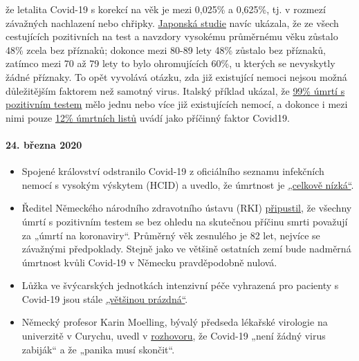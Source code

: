 \begin{itemize}
  že letalita Covid-19 s korekcí na věk je mezi 0,025\% a 0,625\%, tj. v
  rozmezí závažných nachlazení nebo chřipky.
  \href{https://www.niid.go.jp/niid/en/2019-ncov-e/9407-covid-dp-fe-01.html}{Japonská
  studie} navíc ukázala, že ze všech cestujících pozitivních na test a
  navzdory vysokému průměrnému věku zůstalo 48\% zcela bez příznaků;
  dokonce mezi 80-89 lety 48\% zůstalo bez příznaků, zatímco mezi 70 až
  79 lety to bylo ohromujících 60\%, u kterých se nevyskytly žádné
  příznaky. To opět vyvolává otázku, zda již existující nemoci nejsou
  možná důležitějším faktorem než samotný virus. Italský příklad ukázal,
  že
  \href{https://www.bloomberg.com/news/articles/2020-03-18/99-of-those-who-died-from-virus-had-other-illness-italy-says}{99\%
  úmrtí s pozitivním testem} mělo jednu nebo více již existujících
  nemocí, a dokonce i mezi nimi pouze
  \href{https://web.archive.org/web/20200324214448/https:/www.telegraph.co.uk/global-health/science-and-disease/have-many-coronavirus-patients-died-italy/}{12\%
  úmrtních listů} uvádí jako příčinný faktor Covid19.
\end{itemize}

\hypertarget{24-bux159ezna-2020}{%
\paragraph{24. března 2020}\label{24-bux159ezna-2020}}

\begin{itemize}
\tightlist
\item
  Spojené království odstranilo Covid-19 z oficiálního seznamu
  infekčních nemocí s vysokým výskytem (HCID) a uvedlo, že úmrtnost je
  \href{https://www.gov.uk/guidance/high-consequence-infectious-diseases-hcid\#status-of-covid-19}{„celkově
  nízká``}.
\item
  Ředitel Německého národního zdravotního ústavu (RKI)
  \href{https://swprs.org/rki-relativiert-corona-todesfaelle/}{připustil},
  že všechny úmrtí s pozitivním testem se bez ohledu na skutečnou
  příčinu smrti považují za „úmrtí na koronaviry``. Průměrný věk
  zesnulého je 82 let, nejvíce se závažnými předpoklady. Stejně jako ve
  většině ostatních zemí bude nadměrná úmrtnost kvůli Covid-19 v Německu
  pravděpodobně nulová.
\item
  Lůžka ve švýcarských jednotkách intenzivní péče vyhrazená pro pacienty
  s Covid-19 jsou stále
  \href{https://www.aargauerzeitung.ch/aargau/kanton-aargau/erst-3-von-100-aargauer-betten-der-intensivstationen-sind-belegt-so-ruesten-sich-die-spitaeler-auf-die-epidemie-137332716}{„většinou
  prázdná``}.
\item
  Německý profesor Karin Moelling, bývalý předseda lékařské virologie na
  univerzitě v Curychu, uvedl v
  \href{https://www.radioeins.de/programm/sendungen/die_profis/archivierte_sendungen/beitraege/corona-virus-kein-killervirus.html}{rozhovoru},
  že Covid-19 „není žádný virus zabiják`` a že „panika musí skončit``.
\end{itemize}

